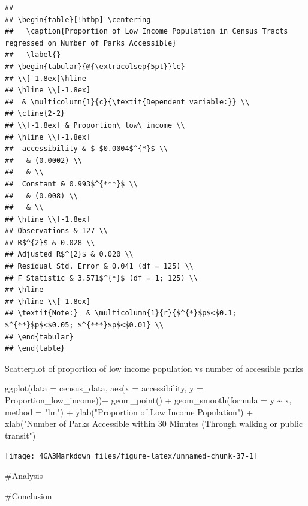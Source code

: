 \documentclass[
]{article}
\newenvironment{Shaded}{\begin{snugshade}}{\end{snugshade}}
\newcommand{\AttributeTok}[1]{\textcolor[rgb]{0.77,0.63,0.00}{#1}}
\newcommand{\FunctionTok}[1]{\textcolor[rgb]{0.00,0.00,0.00}{#1}}
\newcommand{\NormalTok}[1]{#1}
\newcommand{\SpecialCharTok}[1]{\textcolor[rgb]{0.00,0.00,0.00}{#1}}
\newcommand{\StringTok}[1]{\textcolor[rgb]{0.31,0.60,0.02}{#1}}
\begin{document}
\begin{verbatim}
## 
## \begin{table}[!htbp] \centering 
##   \caption{Proportion of Low Income Population in Census Tracts regressed on Number of Parks Accessible} 
##   \label{} 
## \begin{tabular}{@{\extracolsep{5pt}}lc} 
## \\[-1.8ex]\hline 
## \hline \\[-1.8ex] 
##  & \multicolumn{1}{c}{\textit{Dependent variable:}} \\ 
## \cline{2-2} 
## \\[-1.8ex] & Proportion\_low\_income \\ 
## \hline \\[-1.8ex] 
##  accessibility & $-$0.0004$^{*}$ \\ 
##   & (0.0002) \\ 
##   & \\ 
##  Constant & 0.993$^{***}$ \\ 
##   & (0.008) \\ 
##   & \\ 
## \hline \\[-1.8ex] 
## Observations & 127 \\ 
## R$^{2}$ & 0.028 \\ 
## Adjusted R$^{2}$ & 0.020 \\ 
## Residual Std. Error & 0.041 (df = 125) \\ 
## F Statistic & 3.571$^{*}$ (df = 1; 125) \\ 
## \hline 
## \hline \\[-1.8ex] 
## \textit{Note:}  & \multicolumn{1}{r}{$^{*}$p$<$0.1; $^{**}$p$<$0.05; $^{***}$p$<$0.01} \\ 
## \end{tabular} 
## \end{table}
\end{verbatim}

Scatterplot of proportion of low income population vs number of
accessible parks

\begin{Shaded}
\begin{Highlighting}[]
\FunctionTok{ggplot}\NormalTok{(}\AttributeTok{data =}\NormalTok{ census\_data, }
       \FunctionTok{aes}\NormalTok{(}\AttributeTok{x =}\NormalTok{ accessibility, }
           \AttributeTok{y =}\NormalTok{ Proportion\_low\_income))}\SpecialCharTok{+}
  \FunctionTok{geom\_point}\NormalTok{() }\SpecialCharTok{+}
  \FunctionTok{geom\_smooth}\NormalTok{(}\AttributeTok{formula =}\NormalTok{ y }\SpecialCharTok{\textasciitilde{}}\NormalTok{ x,}
              \AttributeTok{method =} \StringTok{"lm"}\NormalTok{) }\SpecialCharTok{+}
  \FunctionTok{ylab}\NormalTok{(}\StringTok{"Proportion of Low Income Population"}\NormalTok{) }\SpecialCharTok{+}
  \FunctionTok{xlab}\NormalTok{(}\StringTok{"Number of Parks Accessible within 30 Minutes (Through walking or public transit"}\NormalTok{) }
\end{Highlighting}
\end{Shaded}

\begin{center}\texttt{[image: 4GA3Markdown\_files/figure-latex/unnamed-chunk-37-1]} \end{center}

\#Analysis

\#Conclusion
\end{document}

